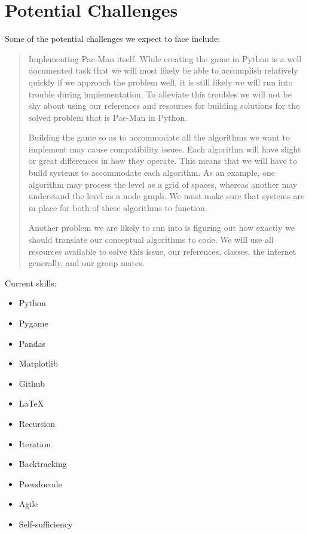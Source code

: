 \documentclass[12pt]{article}
\begin{document}
    \section{Potential Challenges}
        Some of the potential challenges we expect to face include:
        \begin{quote}
            Implementing Pac-Man itself. While creating the game in Python is a well documented task that we will most likely be able to accomplish relatively quickly if we approach the problem well, it is still likely we will run into trouble during implementation. To alleviate this troubles we will not be shy about using our references and resources for building solutions for the solved problem that is Pac-Man in Python.

            Building the game so as to accommodate all the algorithms we want to implement may cause compatibility issues. Each algorithm will have slight or great differences in how they operate. This means that we will have to build systems to accommodate each algorithm. As an example, one algorithm may process the level as a grid of spaces, whereas another may understand the level as a node graph. We must make sure that systems are in place for both of these algorithms to function.

            Another problem we are likely to run into is figuring out how exactly we should translate our conceptual algorithms to code. We will use all resources available to solve this issue, our references, classes, the internet generally, and our group mates.
        \end{quote}
        Current skills:
        \begin{multicols}{2}
            \begin{itemize}
                \itemsep-4pt
                \item Python
                \item Pygame
                \item Pandas
                \item Matplotlib
                \item Github
                \item \LaTeX
                \item Recursion
                \item Iteration
                \item Backtracking
                \item Pseudocode
                \item Agile
                \item Self-sufficiency
            \end{itemize}
        \end{multicols}
\end{document}
